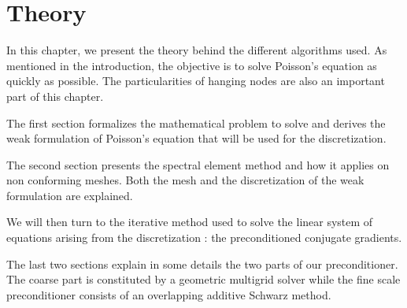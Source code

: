 \chapter{Theory}

In this chapter, we present the theory behind the different algorithms used. As mentioned in the introduction, the objective is to solve Poisson's equation as quickly as possible. The particularities of hanging nodes are also an important part of this chapter. 

The first section formalizes the mathematical problem to solve and derives the weak formulation of Poisson's equation that will be used for the discretization.

The second section presents the spectral element method and how it applies on non conforming meshes. Both the mesh and the discretization of the weak formulation are explained.

We will then turn to the iterative method used to solve the linear system of equations arising from the discretization : the preconditioned conjugate gradients. 

The last two sections explain in some details the two parts of our preconditioner. The coarse part is constituted by a geometric multigrid solver while the fine scale preconditioner consists of an overlapping additive Schwarz method. 